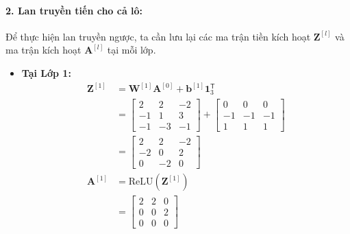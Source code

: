 \paragraph{2. Lan truyền tiến cho cả lô:}
Để thực hiện lan truyền ngược, ta cần lưu lại các ma trận tiền kích hoạt $\mathbf{Z}^{[l]}$ và ma trận kích hoạt $\mathbf{A}^{[l]}$ tại mỗi lớp. 
\begin{itemize}
    \item \textbf{Tại Lớp 1:}
    \begin{align*}
    \mathbf{Z}^{[1]} &= \mathbf{W}^{[1]}\mathbf{A}^{[0]} + \mathbf{b}^{[1]}\mathbf{1}_3^{\mathsf{T}} \\
    &= \begin{bmatrix} 2 & 2 & -2 \\ -1 & 1 & 3 \\ -1 & -3 & -1 \end{bmatrix} + \begin{bmatrix} 0 & 0 & 0 \\ -1 & -1 & -1 \\ 1 & 1 & 1 \end{bmatrix} \\
    &= \begin{bmatrix} 2 & 2 & -2 \\ -2 & 0 & 2 \\ 0 & -2 & 0 \end{bmatrix} \\
    \mathbf{A}^{[1]} &= \text{ReLU}\!\left(\mathbf{Z}^{[1]}\right) \\
    &= \begin{bmatrix} 2 & 2 & 0 \\ 0 & 0 & 2 \\ 0 & 0 & 0 \end{bmatrix}
    \end{align*}


\end{itemize}
